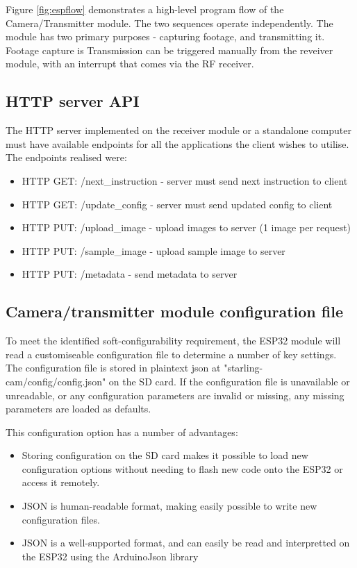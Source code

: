 \documentclass[class=report,11pt,crop=false]{standalone}
\begin{document}
Figure \ref{fig:espflow} demonstrates a high-level program flow of the Camera/Transmitter module. The two sequences operate independently. The module has two primary purposes - capturing footage, and transmitting it. Footage capture is Transmission can be triggered manually from the reveiver module, with an interrupt that comes via the RF receiver. 

\subsection{HTTP server API}

The HTTP server implemented on the receiver module or a standalone computer must have available endpoints for all the applications the client wishes to utilise. The endpoints realised were:

\begin{itemize}
    \item HTTP GET: /next\_instruction - server must send next instruction to client
    \item HTTP GET: /update\_config - server must send updated config to client
    \item HTTP PUT: /upload\_image - upload images to server (1 image per request)
    \item HTTP PUT: /sample\_image - upload sample image to server
    \item HTTP PUT: /metadata - send metadata to server
\end{itemize}

\subsection{Camera/transmitter module configuration file}

To meet the identified soft-configurability requirement, the ESP32 module will read a customiseable configuration file to determine a number of key settings. The configuration file is stored in plaintext json at "starling-cam/config/config.json" on the SD card. If the configuration file is unavailable or unreadable, or any configuration parameters are invalid or missing, any missing parameters are loaded as defaults.

This configuration option has a number of advantages:

\begin{itemize}
    \item Storing configuration on the SD card makes it possible to load new configuration options without needing to flash new code onto the ESP32 or access it remotely.
    \item JSON is human-readable format, making easily possible to write new configuration files.
    \item JSON is a well-supported format, and can easily be read and interpretted on the ESP32 using the ArduinoJson library %
\end{itemize}
\end{document}
